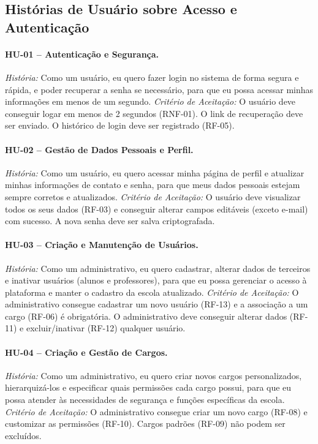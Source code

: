 \subsection{Histórias de Usuário sobre Acesso e Autenticação}

\paragraph{HU-01 -- Autenticação e Segurança.}
\textit{História:} Como um usuário, eu quero fazer login no sistema de forma
segura e rápida, e poder recuperar a senha se necessário, para que eu possa
acessar minhas informações em menos de um segundo.
\textit{Critério de Aceitação:} O usuário deve conseguir logar em menos de 2
segundos (RNF-01). O link de recuperação deve ser enviado. O histórico de
login deve ser registrado (RF-05).

\paragraph{HU-02 -- Gestão de Dados Pessoais e Perfil.}
\textit{História:} Como um usuário, eu quero acessar minha página de perfil
e atualizar minhas informações de contato e senha, para que meus dados
pessoais estejam sempre corretos e atualizados.
\textit{Critério de Aceitação:} O usuário deve visualizar todos os seus
dados (RF-03) e conseguir alterar campos editáveis (exceto e-mail) com
sucesso. A nova senha deve ser salva criptografada.

\paragraph{HU-03 -- Criação e Manutenção de Usuários.}
\textit{História:} Como um administrativo, eu quero cadastrar, alterar
dados de terceiros e inativar usuários (alunos e professores), para que eu
possa gerenciar o acesso à plataforma e manter o cadastro da escola
atualizado.
\textit{Critério de Aceitação:} O administrativo consegue cadastrar um novo
usuário (RF-13) e a associação a um cargo (RF-06) é obrigatória. O
administrativo deve conseguir alterar dados (RF-11) e excluir/inativar
(RF-12) qualquer usuário.

\paragraph{HU-04 -- Criação e Gestão de Cargos.}
\textit{História:} Como um administrativo, eu quero criar novos cargos
personalizados, hierarquizá-los e especificar quais permissões cada cargo
possui, para que eu possa atender às necessidades de segurança e funções
específicas da escola.
\textit{Critério de Aceitação:} O administrativo consegue criar um novo
cargo (RF-08) e customizar as permissões (RF-10). Cargos padrões (RF-09)
não podem ser excluídos.

